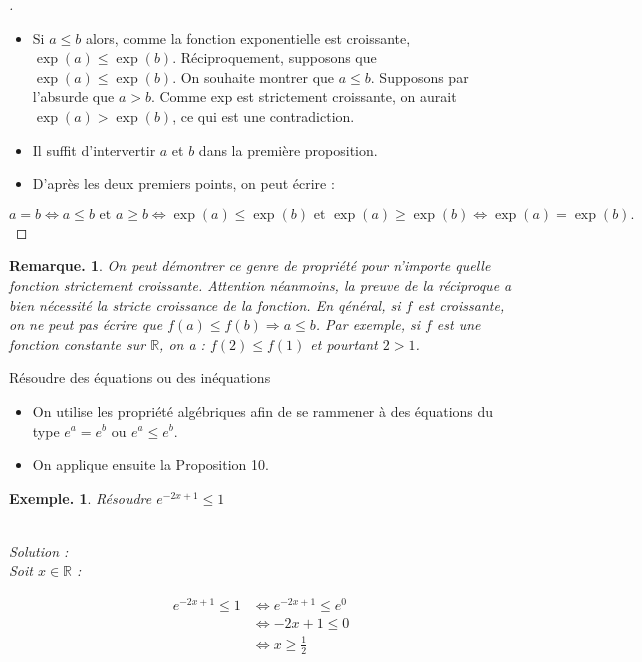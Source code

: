 \documentclass[12pt]{article}
\theoremstyle{break}
\newtheorem*{example}{Exemple.}
\newtheorem*{remark}{Remarque.}
\newenvironment{demo}[1][\proofname]{%
  \begin{proof}[#1]$ $\newline
  }{%
  \end{proof}
}
\begin{document}
\begin{demo}
  \begin{itemize}
    \item Si $a \leqslant b$ alors, comme la fonction exponentielle est croissante, $\exp (a) \leqslant \exp (b)$. Réciproquement, supposons que $\exp (a) \leqslant \exp (b)$. On souhaite montrer que $a \leqslant b$. Supposons par l'absurde que $a>b$. Comme exp est strictement croissante, on aurait $\exp (a)>\exp (b)$, ce qui est une contradiction.
    \item Il suffit d'intervertir $a$ et $b$ dans la première proposition.
    \item D'après les deux premiers points, on peut écrire :
  \end{itemize}

  $$
  a=b \Longleftrightarrow a \leqslant b \text { et } a \geqslant b \Longleftrightarrow \exp (a) \leqslant \exp (b) \text { et } \exp (a) \geqslant \exp (b) \Longleftrightarrow \exp (a)=\exp (b) .
  $$
\end{demo}

\begin{remark}
  On peut démontrer ce genre de propriété pour n'importe quelle fonction strictement croissante. Attention néanmoins, la preuve de la réciproque a bien nécessité la stricte croissance de la fonction. En qénéral, si $f$ est croissante, on ne peut pas écrire que $f(a) \leqslant f(b) \Longrightarrow a \leqslant b$. Par exemple, si $f$ est une fonction constante sur $\mathbb{R}$, on a : $f(2) \leqslant f(1)$ et pourtant $2>1$.
\end{remark}

\begin{method}{Résoudre des équations ou des inéquations}{}
  \begin{itemize}
    \item On utilise les propriété algébriques afin de se rammener à des équations du type $e^{a}=e^{b}$ ou $e^{a} \leqslant e^{b}$.
    \item On applique ensuite la Proposition 10.
  \end{itemize}
\end{method}

\begin{example}
  Résoudre $e^{-2 x+1} \leqslant 1$

  ~\\Solution :\\
  Soit $x \in \mathbb{R}$ :

  $$
  \begin{aligned}
    e^{-2 x+1} \leqslant 1 & \Longleftrightarrow e^{-2 x+1} \leqslant e^{0} \\
    & \Longleftrightarrow-2 x+1 \leqslant 0 \\
    & \Longleftrightarrow x \geqslant \frac{1}{2}
  \end{aligned}
  $$
\end{example}
\end{document}
